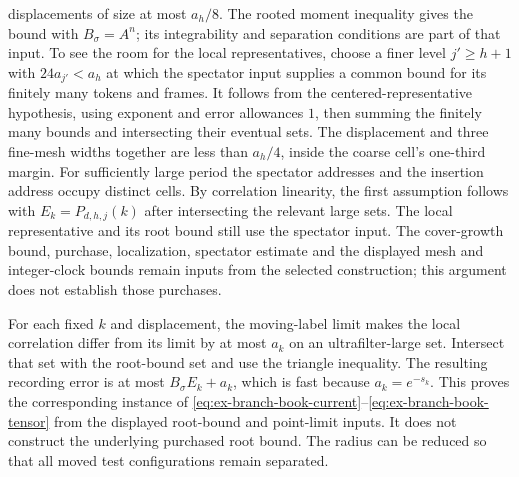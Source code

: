 displacements of size at most $a_h/8$. The rooted moment inequality gives
the bound with $B_\sigma=A^n$; its integrability and separation conditions
are part of that input. To see the room for the local representatives,
choose a finer level $j'\ge h+1$ with $24a_{j'}<a_h$ at which the
spectator input supplies a common bound for its finitely many tokens and
frames. It follows from the centered-representative hypothesis, using
exponent and error allowances $1$, then summing the finitely many bounds
and intersecting their eventual sets. The displacement and three fine-mesh
widths together are less than $a_h/4$, inside the coarse cell's one-third
margin. For sufficiently large period
the spectator addresses and the insertion address occupy distinct cells.
By correlation linearity, the first assumption follows with
$E_k=P_{d,h,j}(k)$ after intersecting the relevant large sets. The local
representative and its root bound still use the spectator input. The cover-growth bound, purchase, localization, spectator estimate and the
displayed mesh and integer-clock bounds remain inputs from the selected
construction; this argument does not establish those purchases.

For each fixed $k$ and displacement, the moving-label limit makes the
local correlation differ from its limit by at most $a_k$ on an ultrafilter-large
set. Intersect that set with the root-bound set and use the triangle
inequality. The resulting recording error is at most
$B_\sigma E_k+a_k$, which is fast because $a_k=e^{-s_k}$. This proves
the corresponding instance of
\eqref{eq:ex-branch-book-current}--\eqref{eq:ex-branch-book-tensor}
from the displayed root-bound and point-limit inputs. It does not construct
the underlying purchased root bound. The radius can be reduced so that all moved
test configurations remain separated.

